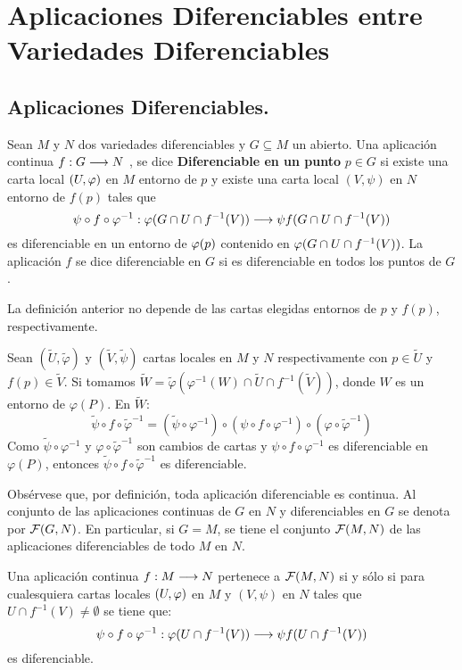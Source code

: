 \documentclass[cursovd_portada.tex]{subfiles}
\begin{document}
\chapter{Aplicaciones Diferenciables entre Variedades Diferenciables}
\section{Aplicaciones Diferenciables.}
\begin{defi}
Sean $M$ y $N$ dos variedades diferenciables y $G\subseteq M$ un abierto. Una aplicación continua $f:G\longrightarrow N$ , se
dice {\bf Diferenciable en un punto} $p\in G$ si existe una carta local $(U,\varphi)$ en $M$ entorno de $p$ y existe
una carta local $(V,\psi)$ en $N$ entorno de $f(p)$ tales que
$$\psi\circ f\circ\varphi^{-1}:\varphi(G\cap U\cap f^{-1}(V))\longrightarrow\psi f(G\cap U\cap f^{-1}(V))$$
es diferenciable en un entorno de $\varphi(p)$ contenido en $\varphi(G\cap U\cap f^{-1}(V))$. La aplicación $f$ se dice
diferenciable en $G$ si es diferenciable en todos los puntos de $G$.
\end{defi}
\begin{prop}
La definición anterior no depende de las cartas elegidas entornos de $p$ y $f(p)$, respectivamente.
\end{prop}
\begin{dem}
Sean $(\tilde{U},\tilde{φ})$ y $(\tilde{V},\tilde{ψ})$ cartas locales en $M$ y $N$ respectivamente con $p \in \tilde{U}$ y $f(p) \in \tilde{V}$. Si tomamos $\tilde{W} = \tilde{φ}(φ^{-1}(W) \cap \tilde{U} \cap f^{-1}(\tilde{V}))$, donde $W$ es un entorno de $φ(P)$. En $\tilde{W}$:
\[ \tilde{ψ} \circ f \circ \tilde{φ}^{-1} = (\tilde{ψ}\circ φ^{-1}) \circ (ψ \circ f \circ φ^{-1}) \circ (φ \circ \tilde{φ}^{-1}) \]
Como $\tilde{ψ} \circ φ^{-1}$ y $φ \circ \tilde{φ}^{-1}$ son cambios de cartas y $ψ \circ f \circ φ^{-1}$ es diferenciable en $φ(P)$, entonces $\tilde{ψ} \circ f \circ \tilde{φ}^{-1}$ es diferenciable.
\end{dem}
Obsérvese que, por definición, toda aplicación
diferenciable es continua. Al conjunto de las aplicaciones
continuas de $G$ en $N$ y diferenciables en $G$ se denota por
${\cal F}(G,N)$. En particular, si $G=M$, se tiene el conjunto
${\cal F}(M,N)$ de las aplicaciones diferenciables de todo $M$ en
$N$.
\begin{prop}
Una aplicación continua $f:M\longrightarrow N$ pertenece a ${\cal F}(M,N)$ si y sólo si para cualesquiera cartas locales
$(U,\varphi)$ en $M$ y $(V,\psi)$ en $N$ tales que $U\cap f^{-1}(V)\neq\emptyset$ se tiene que:
$$\psi\circ f\circ\varphi^{-1}:\varphi(U\cap f^{-1}(V))\longrightarrow\psi f(U\cap f^{-1}(V))$$
es diferenciable.
\end{prop}
\end{document}
